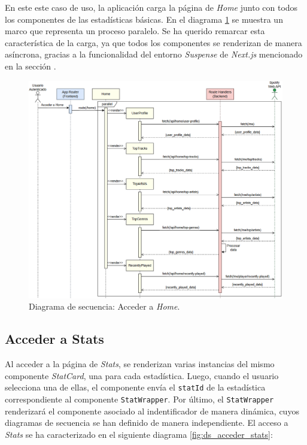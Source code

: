 En este este caso de uso, la aplicación carga la página de \textit{Home} junto con todos los componentes de las estadísticas básicas. En el diagrama \ref{fig:ds_acceder_home} se muestra un marco que representa un proceso paralelo. Se ha querido remarcar esta característica de la carga, ya que todos los componentes se renderizan de manera asíncrona, gracias a la funcionalidad del entorno \textsl{Suspense} de \textit{Next.js} mencionado en la sección .

\begin{figure}[H]
    \centering
    \includegraphics[width=\textwidth]{figures/diagramas_secuencia/ds_acceder_home.png}
    \caption{Diagrama de secuencia: Acceder a \textit{Home}.}
    \label{fig:ds_acceder_home}
\end{figure}

\subsection*{Acceder a Stats}

Al acceder a la página de \textit{Stats}, se renderizan varias instancias del mismo componente \textsl{StatCard}, una para cada estadística. Luego, cuando el usuario selecciona una de ellas, el componente envía el \texttt{statId} de la estadística correspondiente al componente \texttt{StatWrapper}. Por último, el \texttt{StatWrapper} renderizará el componente asociado al indentificador de manera dinámica, cuyos diagramas de secuencia se han definido de manera independiente. El acceso a \textit{Stats} se ha caracterizado en el siguiente diagrama \ref{fig:ds_acceder_stats}:

